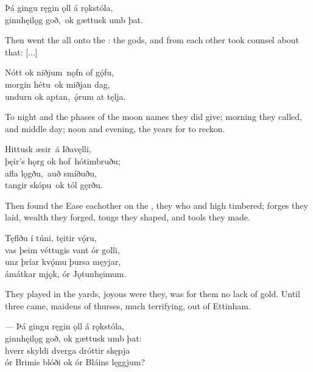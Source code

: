 \bva Þá gingu ręgin ǫll \hld á rǫkstóla, \\%
ginnhęilǫg goð, \hld ok gættusk umb þat.\footnotemark[1]\eva
{}

\bvb Then went the  all onto the : the  gods, and from each other took counsel about that: [...]\evb

\bva Nótt ok niðjum \hld nǫfn of gǫ́fu, \\%
morgin hétu \hld ok miðjan dag, \\%
undurn ok aptan, \hld ǫ́rum at tęlja.\footnotemark[1]\eva
{}

\bvb To night and the phases of the moon names they did give; morning they called, and middle day; noon and evening, the years for to reckon.\evb

\bva Hittusk æsir \hld á Iðavęlli, \\%
þęir’s hǫrg ok hof \hld hótimbruðu; \\%
afla lǫgðu, \hld auð smíðuðu, \\%
tangir skópu \hld ok tól gęrðu.\eva

\bvb Then found the Ease eachother on the , they who  and  high timbered; forges they laid, wealth they forged, tongs they shaped, and tools they made.\evb

\bva Tęflðu í túni, \hld tęitir vǫ́ru, \\%
vas þeim véttugis \hld vant ór golli, \\%
unz þríar kvǫ́mu \hld þursa męyjar, \\%
ámátkar mjǫk, \hld ór Jǫtunhęimum.\eva

\bvb They played  in the yards, joyous were they, was for them no lack of gold. Until three came, maidens of thurses, much terrifying, out of Ettinham.\footnotemark[1]\evb
{}


\bva — Þá gingu ręgin ǫll \hld á rǫkstóla, \\%
ginnhęilǫg goð, \hld ok gættusk umb þat: \\%
hverr skyldi dverga \hld dróttir skępja \\%
ór Brimis blóði \hld ok ór Bláins lęggjum?\footnotemark[1]\eva
{}

